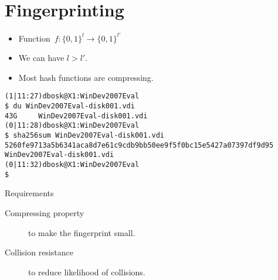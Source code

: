\section{Fingerprinting}

\begin{frame}
  \begin{definition}[Compressing]
    \begin{itemize}
      \item Function~\(f\colon \{0, 1\}^{l}\to \{0, 1\}^{l'}\)
      \item We can have \(l > l'\).
    \end{itemize}
  \end{definition}

  \pause

  \begin{remark}
    \begin{itemize}
      \item Most hash functions are compressing.
    \end{itemize}
  \end{remark}
\end{frame}

\begin{frame}[fragile]
  \begin{example}[Compressing]
    \begin{itemize}
      \begin{verbatim}
(1|11:27)dbosk@X1:WinDev2007Eval
$ du WinDev2007Eval-disk001.vdi
43G     WinDev2007Eval-disk001.vdi
(0|11:28)dbosk@X1:WinDev2007Eval
$ sha256sum WinDev2007Eval-disk001.vdi
5260fe9713a5b6341aca8d7e61c9cdb9bb50ee9f5f0bc15e5427a07397df9d95  WinDev2007Eval-disk001.vdi
(0|11:32)dbosk@X1:WinDev2007Eval
$
      \end{verbatim}
    \end{itemize}
  \end{example}
\end{frame}

\begin{frame}
  \begin{block}{Requirements}
    \begin{description}
      \item[Compressing property] to make the fingerprint small.
      \item[Collision resistance] to reduce likelihood of collisions.
    \end{description}
  \end{block}
\end{frame}

